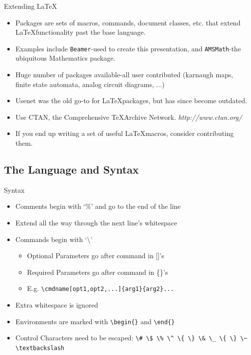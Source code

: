 \documentclass{beamer}
\begin{document}
\begin{frame}{Extending \LaTeX}
  \begin{itemize}
    \item
      Packages are sets of macros, commands, document classes, etc. that extend
      \LaTeX functionality past the base language.
    \item
      Examples include {\tt Beamer}-used to create this presentation, and
      {\tt AMSMath}-the ubiquitous Mathematics package.
    \item
      Huge number of packages available-all user contributed (karnaugh maps, finite state automata, analog circuit diagrams, ...)
    \item
      Usenet was the old go-to for \LaTeX packages, but has since become outdated.
    \item
      Use CTAN, the Comprehensive \TeX Archive Network. {\em http://www.ctan.org/}
    \item
      If you end up writing a set of useful \LaTeX macros, consider contributing them.
  \end{itemize}
\end{frame}

\subsection{The Language and Syntax}

\begin{frame}[fragile]{Syntax}
  \begin{itemize}
    \item
      Comments begin with `\%' and go to the end of the line
    \item
      Extend all the way through the next line's whitespace
    \item
      Commands begin with `\textbackslash'
    \begin{itemize}
      \item
        Optional Parameters go after command in []'s
      \item
        Required Parameters go after command in \{\}'s
      \item
        E.g. \verb|\cmdname[opt1,opt2,...]{arg1}{arg2}...|
    \end{itemize}
    \item
      Extra whitespace is ignored
    \item
      Environments are marked with \verb|\begin{}| and \verb|\end{}|
    \item
      Control Characters need to be escaped:
      \verb|\# \$ \% \^ \{ \} \& \_ \{ \} \~ \textbackslash|
  \end{itemize}
\end{frame}
\end{document}
